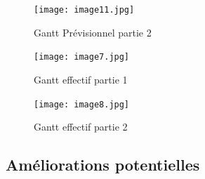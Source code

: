 \documentclass[a4paper,11pt]{article}
\begin{document}
\begin{figure}[ht!]
\centering
\texttt{[image: image11.jpg]} 
\caption {\label{image11} Gantt Prévisionnel partie 2}
\end{figure}
 \smallbreak
\begin{figure}[ht!]
\centering
\texttt{[image: image7.jpg]} 
\caption {\label{image12} Gantt effectif partie 1}
\end{figure}
 \smallbreak
\begin{figure}[ht!]
\centering
\texttt{[image: image8.jpg]} 
\caption {\label{image13} Gantt effectif partie 2}
\end{figure}
 \smallbreak



\subsection{Améliorations potentielles}
\end{document}
